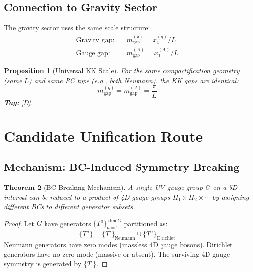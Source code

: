 \documentclass[11pt,a4paper]{article}
\newtheorem{theorem}{Theorem}[section]
\newtheorem{proposition}[theorem]{Proposition}
\begin{document}
\subsection{Connection to Gravity Sector}

The gravity sector uses the same scale structure:
\begin{align}
  \text{Gravity gap:} & \quad m_{\text{gap}}^{(g)} = x_1^{(g)}/L
  \label{eq:gravity-gap} \\
  \text{Gauge gap:} & \quad m_{\text{gap}}^{(A)} = x_1^{(A)}/L
  \label{eq:gauge-gap}
\end{align}

\begin{proposition}[Universal KK Scale]
\label{prop:universal-scale}
For the same compactification geometry (same $L$) and same BC type (e.g., both
Neumann), the KK gaps are identical:
\begin{equation}
  m_{\text{gap}}^{(g)} = m_{\text{gap}}^{(A)} = \frac{\pi}{L}
  \label{eq:universal-gap}
\end{equation}
\textbf{Tag:} [D].
\end{proposition}

\section{Candidate Unification Route}
\label{sec:unification}

\subsection{Mechanism: BC-Induced Symmetry Breaking}

\begin{theorem}[BC Breaking Mechanism]
\label{thm:bc-breaking}
A single UV gauge group $G$ on a 5D interval can be reduced to a product of
4D gauge groups $H_1 \times H_2 \times \cdots$ by assigning different BCs to
different generator subsets.
\end{theorem}

\begin{proof}
Let $G$ have generators $\{T^a\}_{a=1}^{\dim G}$ partitioned as:
\begin{equation}
  \{T^a\} = \{T^i\}_{\text{Neumann}} \cup \{T^{\hat{a}}\}_{\text{Dirichlet}}
  \label{eq:generator-partition}
\end{equation}
Neumann generators have zero modes (massless 4D gauge bosons). Dirichlet
generators have no zero mode (massive or absent). The surviving 4D gauge
symmetry is generated by $\{T^i\}$.
\end{proof}
\end{document}

